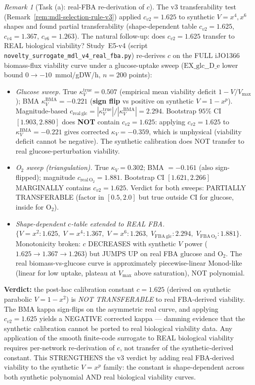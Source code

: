 \documentclass[11pt,a4paper]{article}
\theoremstyle{plain}
\theoremstyle{definition}
\theoremstyle{remark}
\newtheorem{remark}[theorem]{Remark}
\newcommand{\kk}{\kappa_{\!V}}
\begin{document}
\begin{remark}[Task (a): real-FBA re-derivation of $c$]
\label{rem:real-fba-c-v4}
The v3 transferability test (Remark~\ref{rem:mdl-selection-rule-v3})
applied $c_{v2} = 1.625$ to synthetic $V = x^4, x^6$ shapes and found
partial transferability (shape-dependent table $c_{v2} = 1.625$,
$c_{v4} = 1.367$, $c_{v6} = 1.263$). The natural follow-up: does
$c_{v2} = 1.625$ transfer to REAL biological viability? Study~E5-v4
(script \texttt{novelty\_surrogate\_mdl\_v4\_real\_fba.py}) re-derives
$c$ on the FULL iJO1366 biomass-flux viability curve under a
glucose-uptake sweep ($\mathrm{EX\_glc\_\_D\_e}$ lower bound $0 \to
-10$~mmol/gDW/h, $n = 200$ points):
\begin{itemize}
\item[(i)] \emph{Glucose sweep.} True $\kk^{\mathrm{true}} = 0.507$
  (empirical mean viability deficit $1 - V/V_{\max}$); BMA
  $\kk^{\mathrm{BMA}} = -0.221$ (\textbf{sign flip} vs positive on
  synthetic $V = 1 - x^p$). Magnitude-based $c_{\mathrm{real\,glc}} =
  |\kk^{\mathrm{true}}|/|\kk^{\mathrm{BMA}}| = 2.294$. Bootstrap $95\%$
  CI $[1.903, 2.880]$ does \textbf{NOT} contain $c_{v2} = 1.625$:
  applying $c_{v2} = 1.625$ to $\kk^{\mathrm{BMA}} = -0.221$ gives
  corrected $\kk = -0.359$, which is unphysical (viability deficit
  cannot be negative). The synthetic calibration does NOT transfer to
  real glucose-perturbation viability.
\item[(ii)] \emph{O$_2$ sweep (triangulation).} True $\kk = 0.302$;
  BMA $= -0.161$ (also sign-flipped); magnitude $c_{\mathrm{real\,O_2}}
  = 1.881$. Bootstrap CI $[1.621, 2.266]$ MARGINALLY contains
  $c_{v2} = 1.625$. Verdict for both sweeps: PARTIALLY TRANSFERABLE
  (factor in $[0.5, 2.0]$ but true outside CI for glucose, inside for
  O$_2$).
\item[(iii)] \emph{Shape-dependent $c$-table extended to REAL FBA.}
  $\{V{=}x^2\!: 1.625,\; V{=}x^4\!: 1.367,\; V{=}x^6\!: 1.263,\;
  V_{\mathrm{FBA\,glc}}\!: 2.294,\; V_{\mathrm{FBA\,O_2}}\!: 1.881\}$.
  Monotonicity broken: $c$ DECREASES with synthetic $V$ power
  ($1.625 \to 1.367 \to 1.263$) but JUMPS UP on real FBA glucose and
  O$_2$. The real biomass-vs-glucose curve is approximately
  piecewise-linear Monod-like (linear for low uptake, plateau at
  $V_{\max}$ above saturation), NOT polynomial.
\end{itemize}
\textbf{Verdict:} the post-hoc calibration constant $c = 1.625$
(derived on synthetic parabolic $V = 1 - x^2$) is \emph{NOT
TRANSFERABLE} to real FBA-derived viability. The BMA kappa
sign-flips on the asymmetric real curve, and applying $c_{v2} = 1.625$
yields a NEGATIVE corrected kappa --- damning evidence that the
synthetic calibration cannot be ported to real biological viability
data. Any application of the smooth finite-code surrogate to REAL
biological viability requires per-network re-derivation of $c$, not
transfer of the synthetic-derived constant. This STRENGTHENS the v3
verdict by adding real FBA-derived viability to the synthetic
$V = x^p$ family: the constant is shape-dependent across both
synthetic polynomial AND real biological viability curves.
\end{remark}
\end{document}
